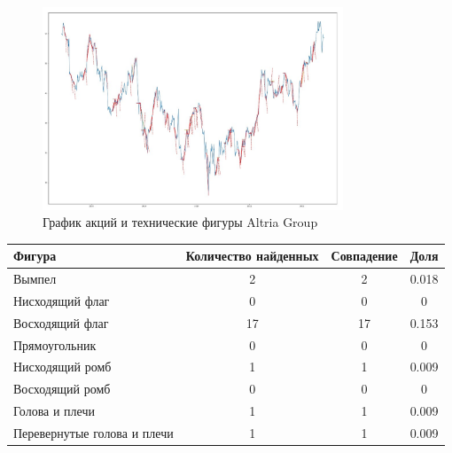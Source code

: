 \documentclass[bachelor, och, coursework]{SCWorks}
\begin{document}
        \begin{figure}[H]
            \centering
            \includegraphics[width=0.8\textwidth]{pic/MO.jpg}
            \caption{График акций и технические фигуры Altria Group}
        \end{figure}
       
        \begin{table}[!hbt]
            \centering
            \begin{tabular}{|l|c|c|c|}
            \hline
            Фигура                      & \multicolumn{1}{l|}{Количество найденных} & Совпадение & Доля  \\ \hline
            Вымпел                      & 2                                         & 2          & 0.018 \\ \hline
            Нисходящий флаг             & 0                                         & 0          & 0     \\ \hline
            Восходящий флаг             & 17                                        & 17         & 0.153 \\ \hline
            Прямоугольник               & 0                                         & 0          & 0     \\ \hline
            Нисходящий ромб             & 1                                         & 1          & 0.009 \\ \hline
            Восходящий ромб             & 0                                         & 0          & 0     \\ \hline
            Голова и плечи              & 1                                         & 1          & 0.009 \\ \hline
            Перевернутые голова и плечи & 1                                         & 1          & 0.009 \\ \hline
            \end{tabular}
            \end{table}
    
\end{document}
